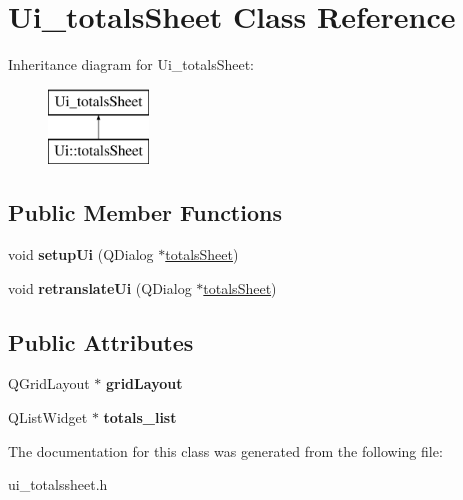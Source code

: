 \hypertarget{class_ui__totals_sheet}{}\section{Ui\+\_\+totals\+Sheet Class Reference}
\label{class_ui__totals_sheet}
Inheritance diagram for Ui\+\_\+totals\+Sheet\+:\begin{figure}[H]
\begin{center}
\leavevmode
\includegraphics[height=2.000000cm]{class_ui__totals_sheet}
\end{center}
\end{figure}
\subsection*{Public Member Functions}
\begin{DoxyCompactItemize}
\item 
\mbox{\label{class_ui__totals_sheet_a90335aca2c8a8a84d29cc992eeaa3988}} 
void {\bfseries setup\+Ui} (Q\+Dialog $\ast$\mbox{\hyperlink{classtotals_sheet}{totals\+Sheet}})
\item 
\mbox{\label{class_ui__totals_sheet_ad75f938fe32afcef82d47226c1d021cc}} 
void {\bfseries retranslate\+Ui} (Q\+Dialog $\ast$\mbox{\hyperlink{classtotals_sheet}{totals\+Sheet}})
\end{DoxyCompactItemize}
\subsection*{Public Attributes}
\begin{DoxyCompactItemize}
\item 
\mbox{\label{class_ui__totals_sheet_a845593c67f994a3552591122a1b28b87}} 
Q\+Grid\+Layout $\ast$ {\bfseries grid\+Layout}
\item 
\mbox{\label{class_ui__totals_sheet_a6ac7b4641e346339038e830fc255c014}} 
Q\+List\+Widget $\ast$ {\bfseries totals\+\_\+list}
\end{DoxyCompactItemize}


The documentation for this class was generated from the following file\+:\begin{DoxyCompactItemize}
\item 
ui\+\_\+totalssheet.\+h\end{DoxyCompactItemize}
